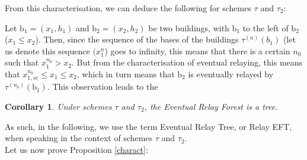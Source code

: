 \documentclass[10pt,english,a4paper]{smfart}
\newtheorem{corollary}{Corollary}[section]
\theoremstyle{definition}
\theoremstyle{remark}
\begin{document}
From this characterisation, we can deduce the following for schemes $\tau$ and $\tau_2$:

Let $\mathrm{b}_1 = (x_1, h_1)$ and $\mathrm{b}_2 = (x_2, h_2)$ be two buildings, with $\mathrm{b}_1$ to the left of $\mathrm{b}_2$ ($x_1\leq x_2$). Then, since the sequence of the bases of the buildings $\tau^{(n)}(b_1)$ (let us denote this sequence $(x_1^{n}$) goes to infinity, this means that there is a certain $n_0$ such that $x_1^{n_0}>x_2$. But from the characterisation of eventual relaying, this means that $x_{1, sc}^{n_0}\leq x_1\leq x_2$, which in turn means that $\mathrm{b}_2$ is eventually relayed by $\tau^{(n_0)}(\mathrm{b}_1)$. This observation leads to the

\begin{corollary}
    Under schemes $\tau$ and $\tau_2$, the Eventual Relay Forest is a tree.
\end{corollary}

As such, in the following, we use the term Eventual Relay Tree, or Relay EFT, when speaking in the context of schemes $\tau$ and $\tau_2$.\\
Let us now prove Proposition \ref{charact}:
\end{document}
